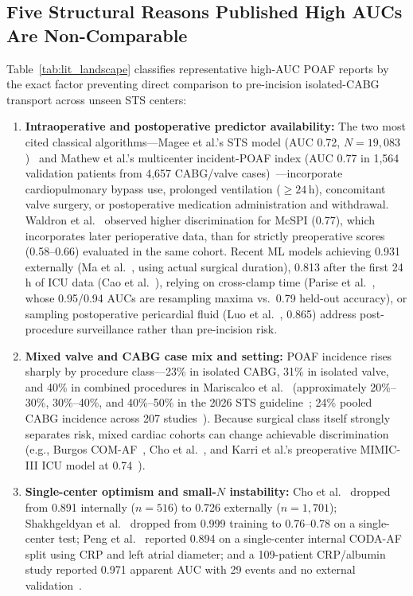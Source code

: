 \subsection{Five Structural Reasons Published High AUCs Are Non-Comparable}
Table~\ref{tab:lit_landscape} classifies representative high-AUC POAF reports by the exact factor preventing direct comparison to pre-incision isolated-CABG transport across unseen STS centers:
\begin{enumerate}
  \item \textbf{Intraoperative and postoperative predictor availability:} The two most cited classical algorithms---Magee et al.'s STS model (AUC 0.72, $N=19{,}083$)~\cite{magee2007atrial} and Mathew et al.'s multicenter incident-POAF index (AUC 0.77 in 1,564 validation patients from 4,657 CABG/valve cases)~\cite{mathew2004multicenter}---incorporate cardiopulmonary bypass use, prolonged ventilation ($\ge 24$\,h), concomitant valve surgery, or postoperative medication administration and withdrawal. Waldron et al.~\cite{waldron2018poaf} observed higher discrimination for McSPI (0.77), which incorporates later perioperative data, than for strictly preoperative scores (0.58--0.66) evaluated in the same cohort. Recent ML models achieving 0.931 externally (Ma et al.~\cite{ma2025noaf}, using actual surgical duration), 0.813 after the first 24\,h of ICU data (Cao et al.~\cite{cao2025mimic4}), relying on cross-clamp time (Parise et al.~\cite{parise2023cabg}, whose 0.95/0.94 AUCs are resampling maxima vs.\ 0.79 held-out accuracy), or sampling postoperative pericardial fluid (Luo et al.~\cite{luo2026pcmpo}, 0.865) address post-procedure surveillance rather than pre-incision risk.
  \item \textbf{Mixed valve and CABG case mix and setting:} POAF incidence rises sharply by procedure class---23\% in isolated CABG, 31\% in isolated valve, and 40\% in combined procedures in Mariscalco et al.~\cite{mariscalco2014poaf} (approximately 20\%--30\%, 30\%--40\%, and 40\%--50\% in the 2026 STS guideline~\cite{chatterjee2026sts}; 24\% pooled CABG incidence across 207 studies~\cite{farzaneh2026incidence}). Because surgical class itself strongly separates risk, mixed cardiac cohorts can change achievable discrimination (e.g., Burgos COM-AF~\cite{burgos2021comaf}, Cho et al.~\cite{cho2026poaf}, and Karri et al.'s preoperative MIMIC-III ICU model at 0.74~\cite{karri2021poaf}).
  \item \textbf{Single-center optimism and small-$N$ instability:} Cho et al.~\cite{cho2026poaf} dropped from 0.891 internally ($n=516$) to 0.726 externally ($n=1{,}701$); Shakhgeldyan et al.~\cite{shakhgeldyan2026cabg} dropped from 0.999 training to 0.76--0.78 on a single-center test; Peng et al.~\cite{peng2024codaaf} reported 0.894 on a single-center internal CODA-AF split using CRP and left atrial diameter; and a 109-patient CRP/albumin study reported 0.971 apparent AUC with 29 events and no external validation~\cite{javaherforooshzadeh2026car}.

\end{enumerate}
